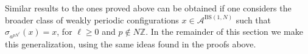 \documentclass[letterpaper,10pt]{article}
\theoremstyle{plain}
\newcommand{\BS}[1][N]{\mathrm{BS}(1,#1)}
\begin{document}
%	
	Similar results to the ones proved above can be obtained if one considers the broader class of weakly periodic configurations $x\in \mathcal{A}^{\BS}$ such that $\sigma_{a^{pN^\ell}}(x)=x$, for $\ell\ge 0$ and $p\notin N\mathbb{Z}$. In the remainder of this section we make this generalization, using the same ideas found in the proofs above.
	
\end{document}
